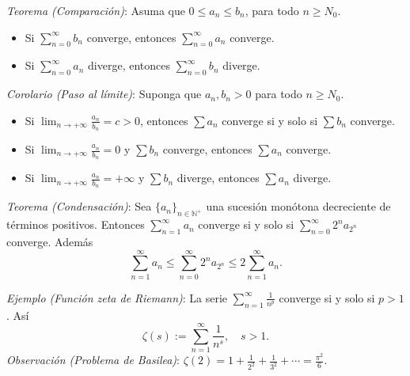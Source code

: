 \documentclass{beamer}
\begin{document}
  \begin{frame}
    \textit{Teorema (Comparación)}: Asuma que $0 \leq a_n \leq b_n$, para todo
    $n \geq N_0$.
    \begin{itemize}[<+->]
      \item Si $\sum_{n=0}^{\infty} b_n$ converge, entonces $\sum_{n=0}^{\infty} a_n$ converge.
      \item Si $\sum_{n=0}^{\infty} a_n$ diverge, entonces $\sum_{n=0}^{\infty} b_n$ diverge.
    \end{itemize}
    \vspace{0.3cm}
    \pause

    \textit{Corolario (Paso al límite)}: Suponga que $a_n, b_n > 0$ para todo
    $n \geq N_0$.
    \begin{itemize}[<+->]
      \item Si $\lim_{n \to +\infty} \frac{a_n}{b_n} = c > 0$, entonces
        $\sum a_n$ converge si y solo si $\sum b_n$ converge.
      \item Si $\lim_{n \to +\infty} \frac{a_n}{b_n} = 0$ y $\sum b_n$ converge,
        entonces $\sum a_n$ converge.
      \item Si $\lim_{n \to +\infty} \frac{a_n}{b_n} = +\infty$ y $\sum b_n$ diverge,
        entonces $\sum a_n$ diverge.
    \end{itemize}
  \end{frame}

  \begin{frame}
    \textit{Teorema (Condensación)}: Sea $\{a_n\}_{n \in \mathbb{N}^+}$ una
    sucesión monótona decreciente de términos positivos. Entonces
    $\sum_{n=1}^{\infty} a_n$ converge si y solo si
    $\sum_{n=0}^{\infty} 2^n a_{2^n}$ converge. Además
    \[
      \sum_{n=1}^{\infty} a_n \leq \sum_{n=0}^{\infty} 2^n a_{2^n} \leq 2 \sum_{n=1}^{\infty} a_n.
    \]
    \pause

    \textit{Ejemplo (Función zeta de Riemann)}: La serie
    $\sum_{n=1}^{\infty} \frac{1}{n^p}$ converge si y solo si $p > 1$. Así
    \[
      \zeta(s) := \sum_{n=1}^{\infty} \frac{1}{n^s}, \quad s > 1.
    \]
    \pause
    \textit{Observación (Problema de Basilea)}:
    $\zeta(2) = 1 + \frac{1}{2^2} + \frac{1}{3^2} + \cdots = \frac{\pi^2}{6}$.
  \end{frame}
\end{document}
